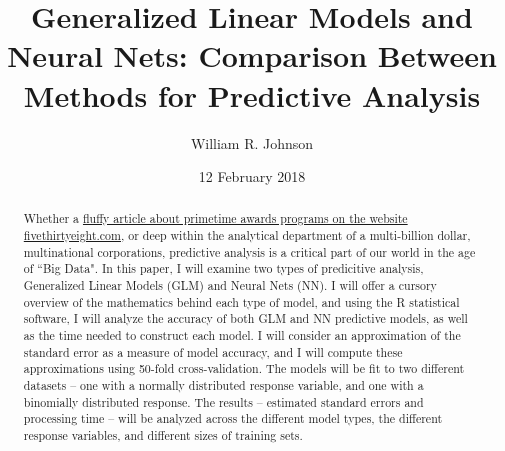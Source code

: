 \documentclass[12pt]{article}
\begin{document}
	\title{Generalized Linear Models and Neural Nets: Comparison Between Methods for Predictive Analysis}
	\author{William R. Johnson}
	\date{12 February 2018}
	\maketitle

	\renewcommand{\abstractname}{Abstract:}
	\begin{abstract}
		Whether a \href{https://fivethirtyeight.com/features/oscars-2018-early-predictions-nominations/}{fluffy article about primetime 
awards programs on the website fivethirtyeight.com}, or deep within the analytical 
department of a multi-billion dollar, multinational corporations, predictive analysis is a critical part of our world in the age of ``Big Data".  
In this paper, I will examine two types of predicitive analysis, Generalized Linear Models (GLM) and Neural Nets (NN).  I will offer a cursory 
overview of the mathematics behind each type of model, and using the R statistical software, I will analyze the accuracy of both GLM and NN 
predictive models, as well as the time needed to construct each model. I will consider an approximation of the standard error as a measure of model 
accuracy, and I will compute these approximations using 50-fold cross-validation.  The models will be fit to two different datasets -- one with a 
normally distributed response variable, and one with a binomially distributed response.  The results -- estimated standard errors and processing 
time -- will be analyzed across the different model types, the different response variables, and different sizes of training sets.
	\end{abstract}
	\vfill\eject



\end{document}

